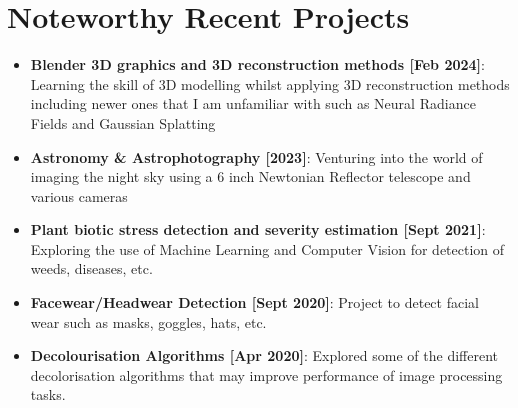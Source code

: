 \documentclass[letterpaper,11pt]{article}
\newcommand{\resumeItem}[2]{
  \item\small{
    \textbf{#1}{: #2 \vspace{-2pt}}
  }
}
\newcommand{\resumeSubItem}[2]{\resumeItem{#1}{#2}\vspace{-4pt}}
\newcommand{\resumeSubHeadingListStart}{\begin{itemize}[leftmargin=*]}
\newcommand{\resumeSubHeadingListEnd}{\end{itemize}}
\begin{document}
\section{Noteworthy Recent Projects}
  \resumeSubHeadingListStart
    \resumeSubItem{Blender 3D graphics and 3D reconstruction methods [Feb 2024]}{ Learning the skill of 3D modelling whilst applying 3D reconstruction methods including newer ones that I am unfamiliar with such as Neural Radiance Fields and Gaussian Splatting }
    \resumeSubItem{Astronomy \& Astrophotography [2023]}{ Venturing into the world of imaging the night sky using a 6 inch Newtonian Reflector telescope and various cameras }
    \resumeSubItem{Plant biotic stress detection and severity estimation [Sept 2021]}{Exploring the use of Machine Learning and Computer Vision for detection of weeds, diseases, etc.}
    \resumeSubItem{Facewear/Headwear Detection [Sept 2020]}{Project to detect facial wear such as masks, goggles, hats, etc.}
    \resumeSubItem{Decolourisation Algorithms [Apr 2020]}{Explored some of the different decolorisation algorithms that may improve performance of image processing tasks.}
  \resumeSubHeadingListEnd

\end{document}
